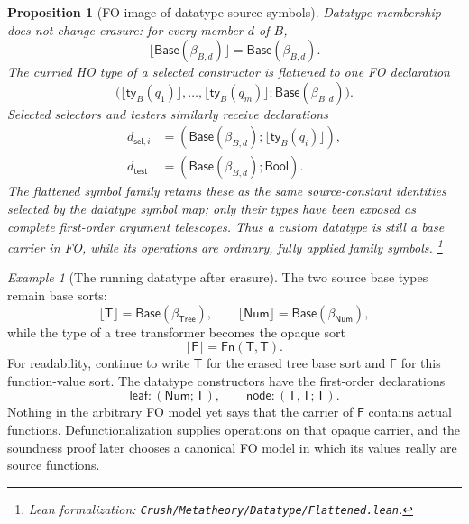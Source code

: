 \documentclass[11pt]{article}
\newtheorem{proposition}[definition]{Proposition}
\theoremstyle{remark}
\newtheorem{example}[definition]{Example}
\newcommand{\leanfile}[1]{\footnote{Lean formalization: \texttt{Crush/Metatheory/#1}.}}
\newcommand{\Bool}{\mathsf{Bool}}
\newcommand{\Base}{\mathsf{Base}}
\newcommand{\Fn}{\mathsf{Fn}}
\newcommand{\erase}[1]{\lfloor #1\rfloor}
\newcommand{\dsort}[2]{\beta_{#1,#2}}
\newcommand{\Tree}{\mathsf{Tree}}
\newcommand{\Num}{\mathsf{Num}}
\newcommand{\TreeTy}{\mathsf{T}}
\newcommand{\TreeFun}{\mathsf{F}}
\begin{document}
\begin{proposition}[FO image of datatype source symbols]
Datatype membership does not change erasure: for every member $d$ of $B$,
\[
 \erase{\Base(\dsort{B}{d})}=\Base(\dsort{B}{d}).
\]
The curried HO type of a selected constructor is flattened to one FO
declaration
\[
 \bigl(
   \erase{\mathsf{ty}_B(q_1)},\ldots,
   \erase{\mathsf{ty}_B(q_m)};
   \Base(\dsort{B}{d})
 \bigr).
\]
Selected selectors and testers similarly receive declarations
\[
 \begin{aligned}
  d_{\mathsf{sel},i}
    &=(\Base(\dsort{B}{d});\erase{\mathsf{ty}_B(q_i)}),\\
  d_{\mathsf{test}}
    &=(\Base(\dsort{B}{d});\Bool).
 \end{aligned}
\]
The flattened symbol family retains these as
the same source-constant identities selected by the datatype symbol map; only their
types have been exposed as complete first-order argument telescopes. Thus a
custom datatype is still a base carrier in FO, while its operations are
ordinary, fully applied family symbols.
\leanfile{Datatype/Flattened.lean}
\end{proposition}

\begin{example}[The running datatype after erasure]
The two source base types remain base sorts:
\[
 \erase{\TreeTy}=\Base(\beta_{\Tree}),
 \qquad
 \erase{\Num}=\Base(\beta_{\Num}),
\]
while the type of a tree transformer becomes the opaque sort
\[
 \erase{\TreeFun}=\Fn(\TreeTy,\TreeTy).
\]
For readability, continue to write $\TreeTy$ for the erased tree base sort and
$\TreeFun$ for this function-value sort. The datatype constructors have
the first-order declarations
\[
 \mathsf{leaf}:(\Num;\TreeTy),
 \qquad
 \mathsf{node}:(\TreeTy,\TreeTy;\TreeTy).
\]
Nothing in the arbitrary FO model yet says that the carrier of $\TreeFun$
contains actual functions. Defunctionalization supplies operations on that
opaque carrier, and the soundness proof later chooses a canonical FO model in
which its values really are source functions.
\end{example}
\end{document}
